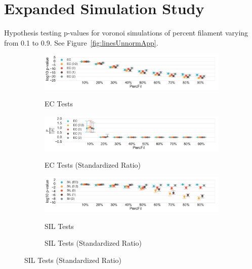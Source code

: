 \documentclass[12pt]{article}
\newcommand{\figref}[1]{Figure~\ref{#1}}
\begin{document}

\appendix


\section{Expanded Simulation Study} \label{app:simulation}

Hypothesis testing p-values for voronoi simulations of percent filament varying from 0.1 to 0.9. See \figref{fig:linesUnnormApp}.

  \begin{center}
    \begin{figure}[htp!]
      \centering
      \begin{subfigure}{.48\textwidth}
        \centering
        \caption{EC Tests}
        \includegraphics[width=\linewidth, height = .75in]{figure_8_all_euler_group.pdf}
        \label{fig:all_euler}
      \end{subfigure}
      \begin{subfigure}{.48\textwidth}
        \centering
        \caption{EC Tests (Standardized Ratio)}
        \includegraphics[width=\linewidth, height = .75in]{figure_8_joint_all_euler_group.pdf}
        \label{fig:all_euler_normed}
      \end{subfigure}
      \begin{subfigure}{.48\textwidth}
        \centering
        \caption{SIL Tests}
        \includegraphics[width=\linewidth, height = .75in]{figure_8_all_silhouette_group.pdf}
        \label{fig:all_silh}
      \end{subfigure}
      \begin{subfigure}{.48\textwidth}
        \centering
        \caption{SIL Tests (Standardized Ratio)}

\end{subfigure}
\end{figure}
\end{center}
\end{document}
